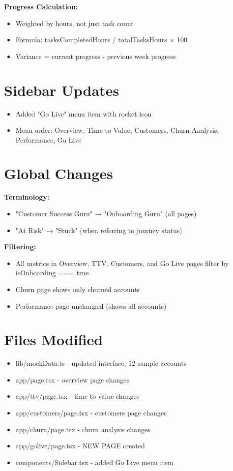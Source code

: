 \documentclass[12pt,a4paper]{article}
\begin{document}
\textbf{Progress Calculation:}
\begin{itemize}[leftmargin=*]
    \item Weighted by hours, not just task count
    \item Formula: tasksCompletedHours / totalTasksHours × 100
    \item Variance = current progress - previous week progress
\end{itemize}

\section*{Sidebar Updates}

\begin{itemize}[leftmargin=*]
    \item Added "Go Live" menu item with rocket icon
    \item Menu order: Overview, Time to Value, Customers, Churn Analysis, Performance, Go Live
\end{itemize}

\section*{Global Changes}

\textbf{Terminology:}
\begin{itemize}[leftmargin=*]
    \item "Customer Success Guru" → "Onboarding Guru" (all pages)
    \item "At Risk" → "Stuck" (when referring to journey status)
\end{itemize}

\textbf{Filtering:}
\begin{itemize}[leftmargin=*]
    \item All metrics in Overview, TTV, Customers, and Go Live pages filter by isOnboarding === true
    \item Churn page shows only churned accounts
    \item Performance page unchanged (shows all accounts)
\end{itemize}

\section*{Files Modified}

\begin{itemize}[leftmargin=*]
    \item lib/mockData.ts - updated interface, 12 sample accounts
    \item app/page.tsx - overview page changes
    \item app/ttv/page.tsx - time to value changes
    \item app/customers/page.tsx - customers page changes
    \item app/churn/page.tsx - churn analysis changes
    \item app/golive/page.tsx - NEW PAGE created
    \item components/Sidebar.tsx - added Go Live menu item
\end{itemize}
\end{document}
